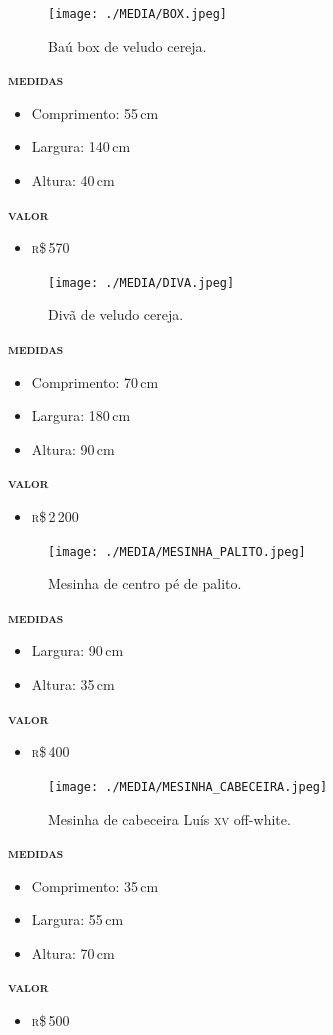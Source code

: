 \pagebreak

\begin{figure}[htpb!]
\texttt{[image: ./MEDIA/BOX.jpeg]}
\caption{Baú box de veludo cereja.}
\end{figure}
\noindent\textsc{\textbf{medidas}}
\begin{itemize}
\item Comprimento: 55\,cm
\item Largura: 140\,cm
\item Altura: 40\,cm
\end{itemize}
\noindent\textsc{\textbf{valor}}
\begin{itemize}
\item \textsc{r}\$\,570
\end{itemize}

\pagebreak

\begin{figure}[htpb!]
\texttt{[image: ./MEDIA/DIVA.jpeg]}
\caption{Divã de veludo cereja.}
\end{figure}
\noindent\textsc{\textbf{medidas}}
\begin{itemize}
\item Comprimento: 70\,cm
\item Largura: 180\,cm
\item Altura: 90\,cm
\end{itemize}
\noindent\textsc{\textbf{valor}}
\begin{itemize}
\item \textsc{r}\$\,2\,200
\end{itemize}

\pagebreak

\begin{figure}[htpb!]
\texttt{[image: ./MEDIA/MESINHA\_PALITO.jpeg]}
\caption{Mesinha de centro pé de palito.}
\end{figure}
\noindent\textsc{\textbf{medidas}}
\begin{itemize}
\item Largura: 90\,cm
\item Altura: 35\,cm
\end{itemize}
\noindent\textsc{\textbf{valor}}
\begin{itemize}
\item \textsc{r}\$\,400
\end{itemize}

\pagebreak

\begin{figure}[htpb!]
\texttt{[image: ./MEDIA/MESINHA\_CABECEIRA.jpeg]}
\caption{Mesinha de cabeceira Luís \textsc{xv} off-white.}
\end{figure}
\noindent\textsc{\textbf{medidas}}
\begin{itemize}
\item Comprimento: 35\,cm
\item Largura: 55\,cm
\item Altura: 70\,cm
\end{itemize}
\noindent\textsc{\textbf{valor}}
\begin{itemize}
\item \textsc{r}\$\,500
\end{itemize}


